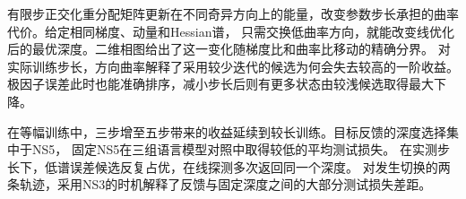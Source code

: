 有限步正交化重分配矩阵更新在不同奇异方向上的能量，改变参数步长承担的曲率代价。给定相同梯度、动量和Hessian谱，
只需交换低曲率方向，就能改变线优化后的最优深度。二维相图给出了这一变化随梯度比和曲率比移动的精确分界。
对实际训练步长，方向曲率解释了采用较少迭代的候选为何会失去较高的一阶收益。
极因子误差此时也能准确排序，减小步长后则有更多状态由较浅候选取得最大下降。

在等幅训练中，三步增至五步带来的收益延续到较长训练。目标反馈的深度选择集中于NS5，
固定NS5在三组语言模型对照中取得较低的平均测试损失。
在实测步长下，低谱误差候选反复占优，在线探测多次返回同一个深度。
对发生切换的两条轨迹，采用NS3的时机解释了反馈与固定深度之间的大部分测试损失差距。
